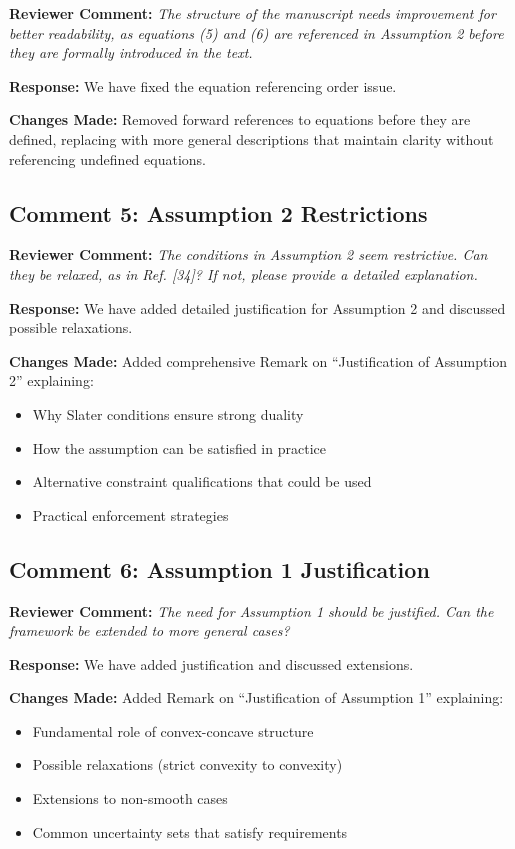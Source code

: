 \documentclass[11pt]{article}
\newcommand{\reviewercomment}[1]{\textbf{Reviewer Comment:} \textit{#1}}
\newcommand{\response}[1]{\textbf{Response:} #1}
\newcommand{\changes}[1]{\textbf{Changes Made:} #1}
\begin{document}
\reviewercomment{The structure of the manuscript needs improvement for better readability, as equations (5) and (6) are referenced in Assumption 2 before they are formally introduced in the text.}

\response{We have fixed the equation referencing order issue.}

\changes{Removed forward references to equations before they are defined, replacing with more general descriptions that maintain clarity without referencing undefined equations.}

\subsection*{Comment 5: Assumption 2 Restrictions}

\reviewercomment{The conditions in Assumption 2 seem restrictive. Can they be relaxed, as in Ref. [34]? If not, please provide a detailed explanation.}

\response{We have added detailed justification for Assumption 2 and discussed possible relaxations.}

\changes{Added comprehensive Remark on ``Justification of Assumption 2'' explaining:
\begin{itemize}
\item Why Slater conditions ensure strong duality
\item How the assumption can be satisfied in practice
\item Alternative constraint qualifications that could be used
\item Practical enforcement strategies
\end{itemize}
}

\subsection*{Comment 6: Assumption 1 Justification}

\reviewercomment{The need for Assumption 1 should be justified. Can the framework be extended to more general cases?}

\response{We have added justification and discussed extensions.}

\changes{Added Remark on ``Justification of Assumption 1'' explaining:
\begin{itemize}
\item Fundamental role of convex-concave structure
\item Possible relaxations (strict convexity to convexity)
\item Extensions to non-smooth cases
\item Common uncertainty sets that satisfy requirements
\end{itemize}
}
\end{document}
